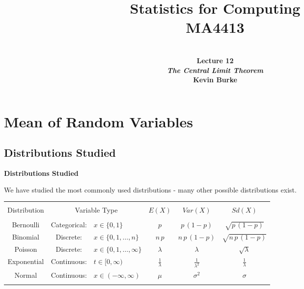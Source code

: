 \documentclass[compress]{beamer}        %
\title{{\huge Statistics for Computing\\[0.1cm]MA4413}}
\author[Kevin Burke]{{\bf\\[0.5cm]{\huge Lecture 12}\\[0.2cm]\emph{The Central Limit Theorem}\\[1.4cm]Kevin Burke}\\[0.3cm]\tcb{kevin.burke@ul.ie}}
\institute[University of Limerick, Maths \& Stats Dept]{}
\date{}
\makeatletter
\newcommand{\tcb}{\textcolor{beamer@blendedblue}}
\makeatother
\begin{document}
\begin{frame}[t]
\titlepage
\end{frame}



\section{Mean of Random Variables}
\subsection{Distributions Studied}
\begin{frame}{\bf \tcb{Distributions Studied}}

We have studied the most commonly used distributions - many other possible distributions exist.

\begin{adjustwidth}{-0.2cm}{0cm}
\begin{footnotesize}
\begin{tabular}{|c|cl|c|c|c|}
\hline
&&&&&\\[-0.1cm]
Distribution & \multicolumn{2}{c|}{Variable Type} & $E(X)$ & $Var(X)$ & $Sd(X)$ \\[0.2cm]
\hline
&&&&&\\[-0.1cm]
Bernoulli & Categorical:& $x \in \{0,1\}$ & $p$ & $p\,(1-p)$ & $\sqrt{p\,(1-p)}$ \\[0.3cm]
Binomial & Discrete: &$x \in \{0,1,\ldots,n\}$ & $n\,p$ & $n\,p\,(1-p)$ & $\sqrt{n\,p\,(1-p)}$ \\[0.3cm]
Poisson & Discrete: &$x \in \{0,1,\ldots,\infty\}$ & $\lambda$ & $\lambda$ & $\sqrt{\lambda}$ \\[0.3cm]
Exponential & Continuous: &$t \in [0,\infty)$ & $\frac{1}{\lambda}$ & $\frac{1}{\lambda^2}$ & $\frac{1}{\lambda}$ \\[0.3cm]
Normal & Continuous: &$x \in (-\infty,\infty)$ & $\mu$ & $\sigma^2$ & $\sigma$\\[0.2cm]
\hline
\multicolumn{6}{c}{} \\[0.3cm]
\end{tabular}
\end{footnotesize}
\end{adjustwidth}

\end{frame}
\end{document}
